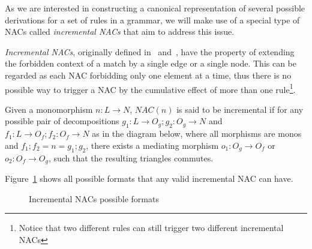 As we are interested in constructing a canonical representation of several possible derivations for a set of rules in a grammar, we will make use of a special type of NACs called \emph{incremental NACs} that aim to address this issue.

\emph{Incremental NACs}, originally defined in~\cite{Corradini2013} and~\cite{Corradini2014}, have the property of extending the forbidden context of a match by a single edge or a single node. This can be regarded as each NAC forbidding only one element at a time, thus there is no possible way to trigger a NAC by the cumulative effect of more than one rule\footnote{Notice that two different rules can still trigger two different incremental NACs}.


\begin{definition} Given a monomorphism \mbox{$n : L \rightarrow N$}, $NAC(n)$ is said to be incremental if for any possible pair of decompositions \mbox{$g_1 : L \rightarrow O_g;g_2 : O_g \rightarrow N$} and \mbox{$f_1 : L \rightarrow O_f;f_2 : O_f \rightarrow N$} as in the diagram below, where all morphisms are monos and \mbox{$f_1;f_2 = n = g_1;g_2$}, there exists a mediating morphism $o_1 : O_g \rightarrow O_f$ or $o_2 : O_f \rightarrow O_g$, such that the resulting triangles
  commutes.


\end{definition}

\begin{example}Figure~\ref{fig:process:incremental-nacs} shows all possible formats that any valid incremental NAC can have.

\begin{figure}[!ht]
  \centering
  \caption{Incremental NACs possible formats}\label{fig:process:incremental-nacs}
\end{figure}
\end{example}

